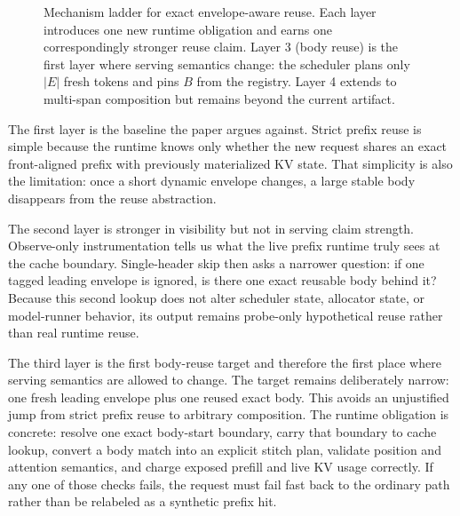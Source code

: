 \documentclass[conference]{IEEEtran}
\begin{document}
\begin{figure}[t]
\caption{Mechanism ladder for exact envelope-aware reuse. Each layer introduces one new runtime obligation and earns one correspondingly stronger reuse claim. Layer 3 (body reuse) is the first layer where serving semantics change: the scheduler plans only $|E|$ fresh tokens and pins $B$ from the registry. Layer 4 extends to multi-span composition but remains beyond the current artifact.}
\label{fig:mechanism-ladder}
\end{figure}

The first layer is the baseline the paper argues against. Strict prefix reuse is simple because the runtime knows only whether the new request shares an exact front-aligned prefix with previously materialized KV state. That simplicity is also the limitation: once a short dynamic envelope changes, a large stable body disappears from the reuse abstraction.

The second layer is stronger in visibility but not in serving claim strength. Observe-only instrumentation tells us what the live prefix runtime truly sees at the cache boundary. Single-header skip then asks a narrower question: if one tagged leading envelope is ignored, is there one exact reusable body behind it? Because this second lookup does not alter scheduler state, allocator state, or model-runner behavior, its output remains probe-only hypothetical reuse rather than real runtime reuse.

The third layer is the first body-reuse target and therefore the first place where serving semantics are allowed to change. The target remains deliberately narrow: one fresh leading envelope plus one reused exact body. This avoids an unjustified jump from strict prefix reuse to arbitrary composition. The runtime obligation is concrete: resolve one exact body-start boundary, carry that boundary to cache lookup, convert a body match into an explicit stitch plan, validate position and attention semantics, and charge exposed prefill and live KV usage correctly. If any one of those checks fails, the request must fail fast back to the ordinary path rather than be relabeled as a synthetic prefix hit.
\end{document}
